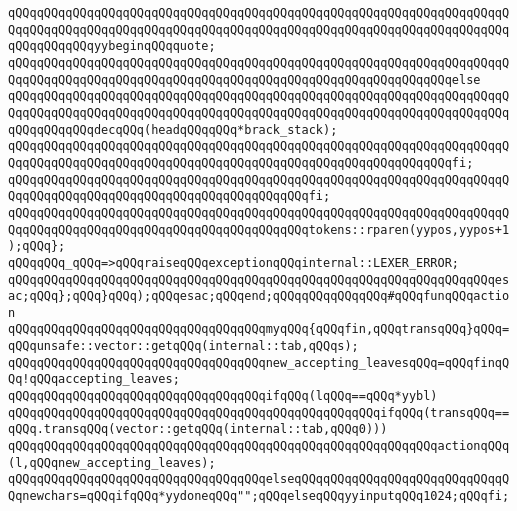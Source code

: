 \verb|qQQqqQQqqQQqqQQqqQQqqQQqqQQqqQQqqQQqqQQqqQQqqQQqqQQqqQQqqQQqqQQqqQQqqQQqqQQqqQQqqQQqqQQqqQQqqQQqqQQqqQQqqQQqqQQqqQQqqQQqqQQqqQQqqQQqqQQqqQQqqQQqqQQqqQQqyybeginqQQqquote;|\newline
\verb|qQQqqQQqqQQqqQQqqQQqqQQqqQQqqQQqqQQqqQQqqQQqqQQqqQQqqQQqqQQqqQQqqQQqqQQqqQQqqQQqqQQqqQQqqQQqqQQqqQQqqQQqqQQqqQQqqQQqqQQqqQQqqQQqqQQqelse|\newline
\verb|qQQqqQQqqQQqqQQqqQQqqQQqqQQqqQQqqQQqqQQqqQQqqQQqqQQqqQQqqQQqqQQqqQQqqQQqqQQqqQQqqQQqqQQqqQQqqQQqqQQqqQQqqQQqqQQqqQQqqQQqqQQqqQQqqQQqqQQqqQQqqQQqqQQqqQQqdecqQQq(headqQQqqQQq*brack_stack);|\newline
\verb|qQQqqQQqqQQqqQQqqQQqqQQqqQQqqQQqqQQqqQQqqQQqqQQqqQQqqQQqqQQqqQQqqQQqqQQqqQQqqQQqqQQqqQQqqQQqqQQqqQQqqQQqqQQqqQQqqQQqqQQqqQQqqQQqqQQqfi;|\newline
\verb|qQQqqQQqqQQqqQQqqQQqqQQqqQQqqQQqqQQqqQQqqQQqqQQqqQQqqQQqqQQqqQQqqQQqqQQqqQQqqQQqqQQqqQQqqQQqqQQqqQQqqQQqqQQqqQQqfi;|\newline
\verb|qQQqqQQqqQQqqQQqqQQqqQQqqQQqqQQqqQQqqQQqqQQqqQQqqQQqqQQqqQQqqQQqqQQqqQQqqQQqqQQqqQQqqQQqqQQqqQQqqQQqqQQqqQQqqQQqtokens::rparen(yypos,yypos+1);qQQq};|\newline
\verb|qQQqqQQq_qQQq=>qQQqraiseqQQqexceptionqQQqinternal::LEXER_ERROR;|\newline
\newline
\verb|qQQqqQQqqQQqqQQqqQQqqQQqqQQqqQQqqQQqqQQqqQQqqQQqqQQqqQQqqQQqqQQqqQQqesac;qQQq};qQQq}qQQq);qQQqesac;qQQqend;qQQqqQQqqQQqqQQq#qQQqfunqQQqaction|\newline
\newline
\verb|qQQqqQQqqQQqqQQqqQQqqQQqqQQqqQQqqQQqmyqQQq{qQQqfin,qQQqtransqQQq}qQQq=qQQqunsafe::vector::getqQQq(internal::tab,qQQqs);|\newline
\verb|qQQqqQQqqQQqqQQqqQQqqQQqqQQqqQQqqQQqnew_accepting_leavesqQQq=qQQqfinqQQq!qQQqaccepting_leaves;|\newline
\verb|qQQqqQQqqQQqqQQqqQQqqQQqqQQqqQQqqQQqifqQQq(lqQQq==qQQq*yybl)|\newline
\verb|qQQqqQQqqQQqqQQqqQQqqQQqqQQqqQQqqQQqqQQqqQQqqQQqqQQqifqQQq(transqQQq==qQQq.transqQQq(vector::getqQQq(internal::tab,qQQq0)))|\newline
\verb|qQQqqQQqqQQqqQQqqQQqqQQqqQQqqQQqqQQqqQQqqQQqqQQqqQQqqQQqqQQqactionqQQq(l,qQQqnew_accepting_leaves);|\newline
\verb|qQQqqQQqqQQqqQQqqQQqqQQqqQQqqQQqqQQqelseqQQqqQQqqQQqqQQqqQQqqQQqqQQqqQQqnewchars=qQQqifqQQq*yydoneqQQq"";qQQqelseqQQqyyinputqQQq1024;qQQqfi;|\newline
